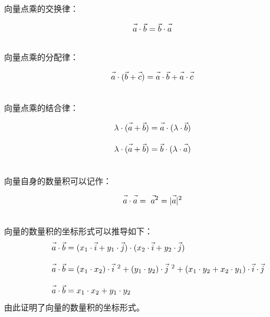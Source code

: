 \documentclass[UTF8]{ctexart}
\let\nvec\vec
\def\vec#1{\nvec{\vphantom b\smash{#1}}}
\begin{document}
    向量点乘的交换律：
    \begin{large}
        \begin{equation*}
            \vec{a}\cdot\vec{b}=\vec{b}\cdot\vec{a}
        \end{equation*}
    \end{large}\\
    向量点乘的分配律：
    \begin{large}
        \begin{equation*}
            \vec{a}\cdot(\vec{b}+\vec{c})=\vec{a}\cdot\vec{b}+\vec{a}\cdot\vec{c}
        \end{equation*}
    \end{large}\\
    向量点乘的结合律：
    \begin{large}
        \begin{align*}
            &\lambda\cdot(\vec{a}+\vec{b})=\vec{a}\cdot(\lambda\cdot\vec{b})\\[3mm]
            &\lambda\cdot(\vec{a}+\vec{b})=\vec{b}\cdot(\lambda\cdot\vec{a})
        \end{align*}
    \end{large}\\
    向量自身的数量积可以记作：
    \begin{large}
        \begin{equation*}
            \vec{a}\cdot\vec{a}=\vec{\hspace{3.0pt}a^2}=|\vec{a}|^2
        \end{equation*}
    \end{large}\\
    向量的数量积的坐标形式可以推导如下：
    \begin{align}
        &~~~~\vec{a}\cdot\vec{b}=(x_1\cdot\vec{i}+y_1\cdot\vec{j})\cdot(x_2\cdot\vec{i}+y_2\cdot\vec{j})\\[3mm]
        &~~~~\vec{a}\cdot\vec{b}=(x_1\cdot x_2)\cdot\vec{i}~^2+(y_1\cdot y_2)\cdot\vec{j}~^2+(x_1\cdot y_2+x_2\cdot y_1)\cdot\vec{i}\cdot\vec{j}\\[3mm]
        &~~~~\vec{a}\cdot\vec{b}=x_1\cdot x_2+y_1\cdot y_2
    \end{align}
    由此证明了向量的数量积的坐标形式。\vspace{15pt}
\end{document}
